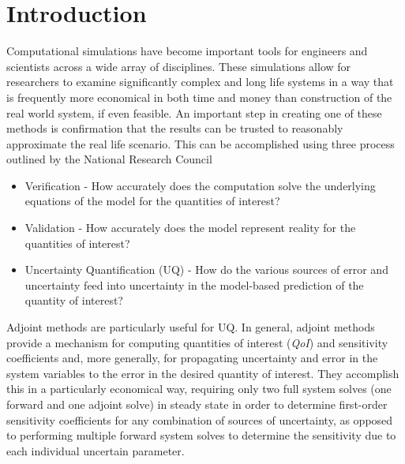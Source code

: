 \documentclass[12pt]{report}
\newcommand{\qoi}{{\it QoI}\xspace}
\begin{document}
\section{Introduction}

Computational simulations have become important tools for engineers and scientists across a wide array of disciplines. These simulations allow for researchers to examine significantly complex and long life systems in a way that is frequently more economical in both time and money than construction of the real world system, if even feasible. An important step in creating one of these methods is confirmation that the results can be trusted to reasonably approximate the real life scenario. This can be accomplished using three process outlined by the National Research Council \cite{NRCVVUQ}


\begin{itemize}
\item Verification - How accurately does the computation solve the underlying equations of the model for the quantities of interest?
\item Validation - How accurately does the model represent reality for the quantities of interest?
\item Uncertainty Quantification (UQ) -  How do the various sources of error and uncertainty feed into uncertainty in the model-based prediction of the quantity of interest?
\end{itemize}


Adjoint methods are particularly useful for UQ. In general, adjoint methods provide a mechanism for computing quantities
 of interest (\qoi) and sensitivity coefficients and, more generally, for propagating uncertainty and error in the 
 system variables to the error in the desired quantity of interest. They accomplish this in a particularly economical 
 way, requiring only two full system solves (one forward and one adjoint solve) in steady state in order to determine 
 first-order sensitivity coefficients for any combination of sources of uncertainty, as opposed to performing multiple 
 forward system solves to determine the sensitivity due to each individual uncertain parameter.
\end{document}
